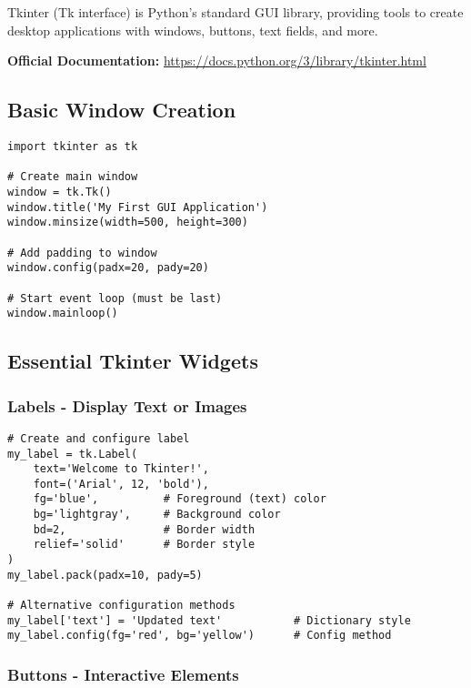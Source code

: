 \documentclass[12pt,a4paper]{article}
\begin{document}
Tkinter (Tk interface) is Python's standard GUI library, providing tools to create desktop applications with windows, buttons, text fields, and more.

\textbf{Official Documentation:} \url{https://docs.python.org/3/library/tkinter.html}

\subsection{Basic Window Creation}

\begin{tcolorbox}[colback=purple!5!white,colframe=purple!75!black,title=Basic Window Setup]
\begin{lstlisting}
import tkinter as tk

# Create main window
window = tk.Tk()
window.title('My First GUI Application')
window.minsize(width=500, height=300)

# Add padding to window
window.config(padx=20, pady=20)

# Start event loop (must be last)
window.mainloop()
\end{lstlisting}
\end{tcolorbox}

\subsection{Essential Tkinter Widgets}

\subsubsection{Labels - Display Text or Images}

\begin{lstlisting}
# Create and configure label
my_label = tk.Label(
    text='Welcome to Tkinter!',
    font=('Arial', 12, 'bold'),
    fg='blue',          # Foreground (text) color
    bg='lightgray',     # Background color
    bd=2,               # Border width
    relief='solid'      # Border style
)
my_label.pack(padx=10, pady=5)

# Alternative configuration methods
my_label['text'] = 'Updated text'           # Dictionary style
my_label.config(fg='red', bg='yellow')      # Config method
\end{lstlisting}

\subsubsection{Buttons - Interactive Elements}
\end{document}
